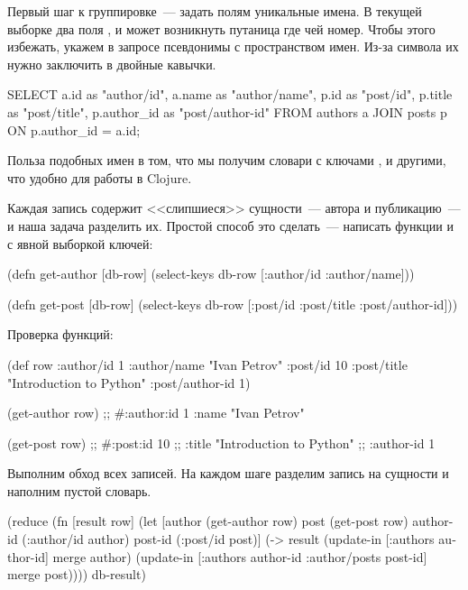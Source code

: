 Первый шаг к группировке~--- задать полям уникальные имена. В текущей выборке два поля , и может возникнуть путаница где чей номер. Чтобы этого избежать, укажем в запросе псевдонимы с пространством имен. Из-за символа \code{/} их нужно заключить в двойные кавычки.

\begin{english}
  \begin{sql}
SELECT
  a.id        as "author/id",
  a.name      as "author/name",
  p.id        as "post/id",
  p.title     as "post/title",
  p.author_id as "post/author-id"
FROM authors a
JOIN posts p ON p.author_id = a.id;
  \end{sql}
\end{english}

Польза подобных имен в том, что мы получим словари с ключами ,  и другими, что удобно для работы в Clojure.

Каждая запись содержит <<слипшиеся>> сущности~--- автора и публикацию~--- и наша задача разделить их. Простой способ это сделать~--- написать функции  и  с явной выборкой ключей:

\begin{english}
  \begin{clojure}
(defn get-author [db-row]
  (select-keys db-row [:author/id :author/name]))

(defn get-post [db-row]
  (select-keys db-row
    [:post/id :post/title :post/author-id]))
  \end{clojure}
\end{english}

Проверка функций:

\begin{english}
  \begin{clojure}
(def row
  {:author/id 1
   :author/name "Ivan Petrov"
   :post/id 10
   :post/title "Introduction to Python"
   :post/author-id 1})

(get-author row)
;; #:author{:id 1 :name "Ivan Petrov"}

(get-post row)
;; #:post{:id 10
;;        :title "Introduction to Python"
;;        :author-id 1}
  \end{clojure}
\end{english}

Выполним обход всех записей. На каждом шаге разделим запись на сущности и наполним пустой словарь.

\begin{english}
  \begin{clojure}
(reduce
 (fn [result row]
   (let [author    (get-author row)
         post      (get-post row)
         author-id (:author/id author)
         post-id   (:post/id post)]
     (-> result
         (update-in [:authors author-id]
                    merge author)
         (update-in [:authors author-id
                     :author/posts post-id]
                    merge post))))
 {}
 db-result)
  \end{clojure}
\end{english}

